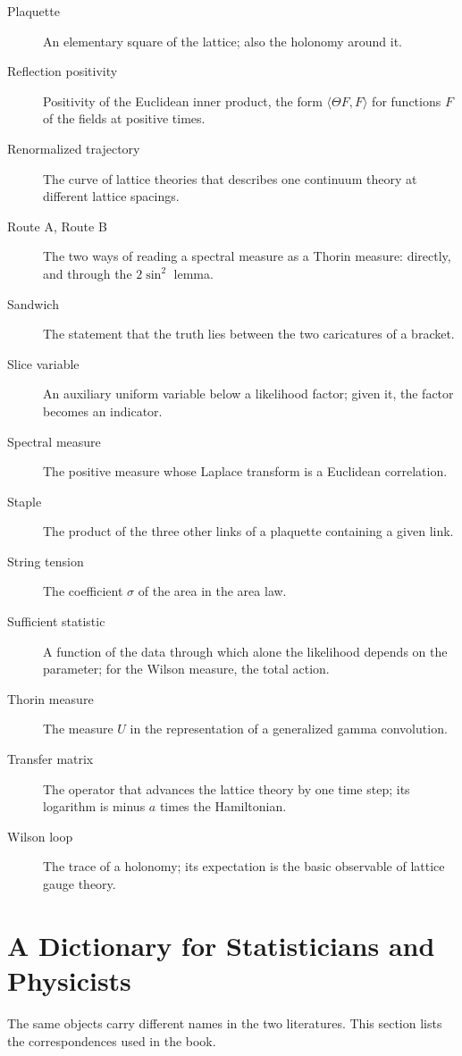 \begin{description}
\item[Plaquette] An elementary square of the lattice; also the holonomy around it.
\item[Reflection positivity] Positivity of the Euclidean inner product, the form $\langle\Theta F,F\rangle$ for functions $F$ of the fields at positive times.
\item[Renormalized trajectory] The curve of lattice theories that describes one continuum theory at different lattice spacings.
\item[Route A, Route B] The two ways of reading a spectral measure as a Thorin measure: directly, and through the $2\sin^2$ lemma.
\item[Sandwich] The statement that the truth lies between the two caricatures of a bracket.
\item[Slice variable] An auxiliary uniform variable below a likelihood factor; given it, the factor becomes an indicator.
\item[Spectral measure] The positive measure whose Laplace transform is a Euclidean correlation.
\item[Staple] The product of the three other links of a plaquette containing a given link.
\item[String tension] The coefficient $\sigma$ of the area in the area law.
\item[Sufficient statistic] A function of the data through which alone the likelihood depends on the parameter; for the Wilson measure, the total action.
\item[Thorin measure] The measure $U$ in the representation of a generalized gamma convolution.
\item[Transfer matrix] The operator that advances the lattice theory by one time step; its logarithm is minus $a$ times the Hamiltonian.
\item[Wilson loop] The trace of a holonomy; its expectation is the basic observable of lattice gauge theory.
\end{description}

\section{A Dictionary for Statisticians and Physicists}\label{ch:dictionary}

The same objects carry different names in the two literatures. This section lists the correspondences used in the book.

